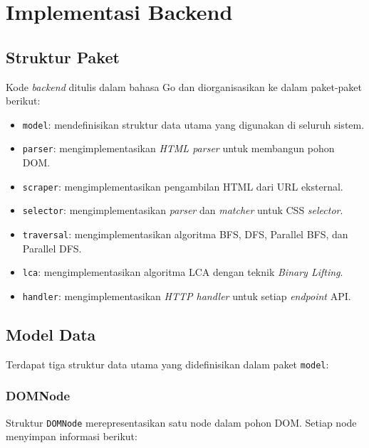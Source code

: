 \section{Implementasi Backend}

\subsection{Struktur Paket}

Kode \textit{backend} ditulis dalam bahasa Go dan diorganisasikan ke dalam paket-paket berikut:

\begin{itemize}
    \item \texttt{model}: mendefinisikan struktur data utama yang digunakan di seluruh sistem.
    \item \texttt{parser}: mengimplementasikan \textit{HTML parser} untuk membangun pohon DOM.
    \item \texttt{scraper}: mengimplementasikan pengambilan HTML dari URL eksternal.
    \item \texttt{selector}: mengimplementasikan \textit{parser} dan \textit{matcher} untuk CSS \textit{selector}.
    \item \texttt{traversal}: mengimplementasikan algoritma BFS, DFS, Parallel BFS, dan Parallel DFS.
    \item \texttt{lca}: mengimplementasikan algoritma LCA dengan teknik \textit{Binary Lifting}.
    \item \texttt{handler}: mengimplementasikan \textit{HTTP handler} untuk setiap \textit{endpoint} API.
\end{itemize}

\subsection{Model Data}

Terdapat tiga struktur data utama yang didefinisikan dalam paket \texttt{model}:

\subsubsection{DOMNode}

Struktur \texttt{DOMNode} merepresentasikan satu node dalam pohon DOM. Setiap node menyimpan informasi berikut:

